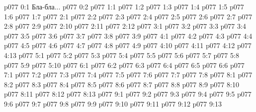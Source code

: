 \author{Архангел}
\vs p077 0:1  Бла-бла...
\vs p077 0:2 
\vs p077 1:1 
\vs p077 1:2 
\vs p077 1:3 
\vs p077 1:4 
\vs p077 1:5 
\vs p077 1:6 \pc 
\vs p077 1:7 
\vs p077 2:1 
\vs p077 2:2 \pc 
\vs p077 2:3 
\vs p077 2:4 
\vs p077 2:5 
\vs p077 2:6 
\vs p077 2:7 \pc 
\vs p077 2:8 
\vs p077 2:9 \pc 
\vs p077 2:10 
\vs p077 2:11 
\vs p077 2:12 
\vs p077 3:1 
\vs p077 3:2 
\vs p077 3:3 
\vs p077 3:4 
\vs p077 3:5 
\vs p077 3:6 
\vs p077 3:7 
\vs p077 3:8 \pc 
\vs p077 3:9 \pc 
{}
\vs p077 4:1 
\vs p077 4:2 
\vs p077 4:3 
\vs p077 4:4 
\vs p077 4:5 
\vs p077 4:6 
\vs p077 4:7 
\vs p077 4:8 
\vs p077 4:9 
\vs p077 4:10 
\vs p077 4:11 \pc 
\vs p077 4:12 
\vs p077 4:13 
\vs p077 5:1 
\vs p077 5:2 \pc 
\vs p077 5:3 
\vs p077 5:4 
\vs p077 5:5 
\vs p077 5:6 \pc 
\vs p077 5:7 \pc 
\vs p077 5:8 
\vs p077 5:9 \pc 
\vs p077 5:10 
\vs p077 6:1 
\vs p077 6:2 
\vs p077 6:3 
\vs p077 6:4 
\vs p077 6:5 \pc 
\vs p077 6:6 
\vs p077 7:1 
\vs p077 7:2 
\vs p077 7:3 
\vs p077 7:4 
\vs p077 7:5 
\vs p077 7:6 
\vs p077 7:7 
\vs p077 7:8 
\vs p077 8:1 
\vs p077 8:2 
\vs p077 8:3 
\vs p077 8:4 
\vs p077 8:5 \pc 
\vs p077 8:6 
\vs p077 8:7 
\vs p077 8:8 
\vs p077 8:9 
\vs p077 8:10 \pc 
\vs p077 8:11 
\vs p077 8:12 
\vs p077 8:13 
\vs p077 9:1 
\vs p077 9:2 
\vs p077 9:3 
\vs p077 9:4 
\vs p077 9:5 
\vs p077 9:6 \pc 
\vs p077 9:7 
\vs p077 9:8 
\vs p077 9:9 
\vs p077 9:10 
\vs p077 9:11 
\vs p077 9:12 \pc 
\vsetoff
\vs p077 9:13 
\quizlink
